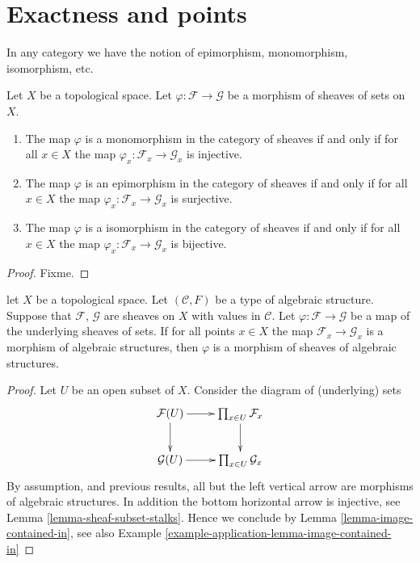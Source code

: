 \section{Exactness and points}
\label{section-exactness-points}

\noindent
In any category we have the notion of epimorphism, monomorphism,
isomorphism, etc.

\begin{lemma}
\label{lemma-points-exactness}
Let $X$ be a topological space. Let $\varphi : \mathcal{F} \to \mathcal{G}$
be a morphism of sheaves of sets on $X$.
\begin{enumerate}
\item The map $\varphi$ is a monomorphism in the category of sheaves
if and only if for all $x \in X$ the map
$\varphi_x : \mathcal{F}_x \to \mathcal{G}_x$
is injective.
\item The map $\varphi$ is an epimorphism in the category of sheaves
if and only if for all $x \in X$ the map
$\varphi_x : \mathcal{F}_x \to \mathcal{G}_x$
is surjective.
\item The map $\varphi$ is a isomorphism in the category of sheaves
if and only if for all $x \in X$ the map
$\varphi_x : \mathcal{F}_x \to \mathcal{G}_x$
is bijective.
\end{enumerate}
\end{lemma}

\begin{proof}
Fixme.
\end{proof}

\begin{lemma}
\label{lemma-check-homomorphism-stalks}
let $X$ be a topological space.
Let $(\mathcal{C}, F)$ be a type of algebraic structure.
Suppose that $\mathcal{F}$, $\mathcal{G}$ are sheaves on $X$
with values in $\mathcal{C}$.
Let $\varphi : \mathcal{F} \to \mathcal{G}$
be a map of the underlying sheaves of sets.
If for all points $x \in X$ the map
$\mathcal{F}_x \to \mathcal{G}_x$
is a morphism of algebraic structures,
then $\varphi$ is a morphism of sheaves of algebraic structures.
\end{lemma}

\begin{proof}
Let $U$ be an open subset of $X$. Consider the diagram of
(underlying) sets
$$
\xymatrix{
\mathcal{F}(U) \ar[r] \ar[d] &
\prod_{x \in U} \mathcal{F}_x \ar[d] \\
\mathcal{G}(U) \ar[r] &
\prod_{x \in U} \mathcal{G}_x
}
$$
By assumption, and previous results, all but the left vertical
arrow are morphisms of algebraic structures. In addition the
bottom horizontal arrow is injective,
see Lemma \ref{lemma-sheaf-subset-stalks}.
Hence we conclude by Lemma \ref{lemma-image-contained-in},
see also Example \ref{example-application-lemma-image-contained-in}
\end{proof}


